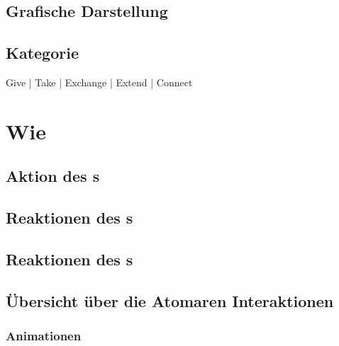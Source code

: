 \subsection*{Grafische Darstellung}
\begin{figure}[H]
\end{figure}

\subsection*{Kategorie}
 Give   |   
 Take   |   
 Exchange   |   
 Extend   |   
 Connect

\newpage
\section*{Wie}

\subsection*{Aktion des \sen s}
\useraction

\subsection*{Reaktionen des \sendev s}
\reactionSen

\subsection*{Reaktionen des \recdev s}
\reactionRec

\subsection*{Übersicht über die Atomaren Interaktionen}
\microinteractionstabular

\subsubsection*{Animationen}
\animations

